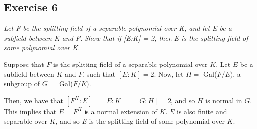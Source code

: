 \subsection*{Exercise 6}
\textit{Let F be the splitting field of a separable polynomial over K, and let E be a subfield between K and F. Show that if [E:K] = 2, then E is the splitting field of some polynomial over K.}

Suppose that $F$ is the splitting field of a separable polynomial over $K$. Let $E$ be a subfield between $K$ and $F$, such that $[E:K] = 2$. Now, let $H =$ Gal($F/E)$, a subgroup of $G =$ Gal($F/K)$.

Then, we have that $[F^H:K] = [E:K] = [G:H] = 2$, and so $H$ is normal in $G$. This implies that $E = F^H$ is a normal extension of $K$. $E$ is also finite and separable over $K$, and so $E$ is the splitting field of some polynomial over $K$.